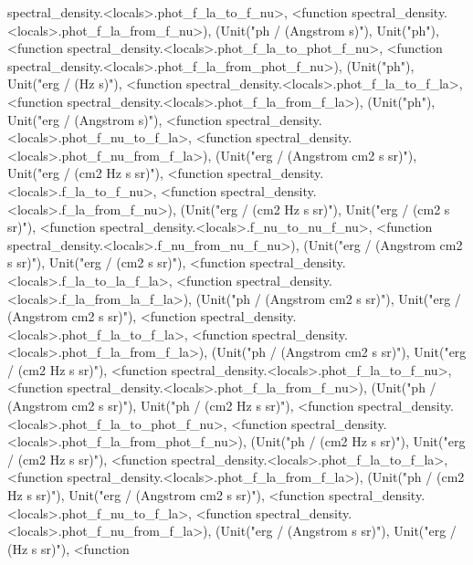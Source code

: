 \documentclass[letterpaper,10pt,english]{sphinxmanual}
\begin{document}
\begin{fulllineitems}
spectral\_density.\textless{}locals\textgreater{}.phot\_f\_la\_to\_f\_nu\textgreater{}, \textless{}function spectral\_density.\textless{}locals\textgreater{}.phot\_f\_la\_from\_f\_nu\textgreater{}), (Unit("ph / (Angstrom s)"), Unit("ph"), \textless{}function spectral\_density.\textless{}locals\textgreater{}.phot\_f\_la\_to\_phot\_f\_nu\textgreater{}, \textless{}function spectral\_density.\textless{}locals\textgreater{}.phot\_f\_la\_from\_phot\_f\_nu\textgreater{}), (Unit("ph"), Unit("erg / (Hz s)"), \textless{}function spectral\_density.\textless{}locals\textgreater{}.phot\_f\_la\_to\_f\_la\textgreater{}, \textless{}function spectral\_density.\textless{}locals\textgreater{}.phot\_f\_la\_from\_f\_la\textgreater{}), (Unit("ph"), Unit("erg / (Angstrom s)"), \textless{}function spectral\_density.\textless{}locals\textgreater{}.phot\_f\_nu\_to\_f\_la\textgreater{}, \textless{}function spectral\_density.\textless{}locals\textgreater{}.phot\_f\_nu\_from\_f\_la\textgreater{}), (Unit("erg / (Angstrom cm2 s sr)"), Unit("erg / (cm2 Hz s sr)"), \textless{}function spectral\_density.\textless{}locals\textgreater{}.f\_la\_to\_f\_nu\textgreater{}, \textless{}function spectral\_density.\textless{}locals\textgreater{}.f\_la\_from\_f\_nu\textgreater{}), (Unit("erg / (cm2 Hz s sr)"), Unit("erg / (cm2 s sr)"), \textless{}function spectral\_density.\textless{}locals\textgreater{}.f\_nu\_to\_nu\_f\_nu\textgreater{}, \textless{}function spectral\_density.\textless{}locals\textgreater{}.f\_nu\_from\_nu\_f\_nu\textgreater{}), (Unit("erg / (Angstrom cm2 s sr)"), Unit("erg / (cm2 s sr)"), \textless{}function spectral\_density.\textless{}locals\textgreater{}.f\_la\_to\_la\_f\_la\textgreater{}, \textless{}function spectral\_density.\textless{}locals\textgreater{}.f\_la\_from\_la\_f\_la\textgreater{}), (Unit("ph / (Angstrom cm2 s sr)"), Unit("erg / (Angstrom cm2 s sr)"), \textless{}function spectral\_density.\textless{}locals\textgreater{}.phot\_f\_la\_to\_f\_la\textgreater{}, \textless{}function spectral\_density.\textless{}locals\textgreater{}.phot\_f\_la\_from\_f\_la\textgreater{}), (Unit("ph / (Angstrom cm2 s sr)"), Unit("erg / (cm2 Hz s sr)"), \textless{}function spectral\_density.\textless{}locals\textgreater{}.phot\_f\_la\_to\_f\_nu\textgreater{}, \textless{}function spectral\_density.\textless{}locals\textgreater{}.phot\_f\_la\_from\_f\_nu\textgreater{}), (Unit("ph / (Angstrom cm2 s sr)"), Unit("ph / (cm2 Hz s sr)"), \textless{}function spectral\_density.\textless{}locals\textgreater{}.phot\_f\_la\_to\_phot\_f\_nu\textgreater{}, \textless{}function spectral\_density.\textless{}locals\textgreater{}.phot\_f\_la\_from\_phot\_f\_nu\textgreater{}), (Unit("ph / (cm2 Hz s sr)"), Unit("erg / (cm2 Hz s sr)"), \textless{}function spectral\_density.\textless{}locals\textgreater{}.phot\_f\_la\_to\_f\_la\textgreater{}, \textless{}function spectral\_density.\textless{}locals\textgreater{}.phot\_f\_la\_from\_f\_la\textgreater{}), (Unit("ph / (cm2 Hz s sr)"), Unit("erg / (Angstrom cm2 s sr)"), \textless{}function spectral\_density.\textless{}locals\textgreater{}.phot\_f\_nu\_to\_f\_la\textgreater{}, \textless{}function spectral\_density.\textless{}locals\textgreater{}.phot\_f\_nu\_from\_f\_la\textgreater{}), (Unit("erg / (Angstrom s sr)"), Unit("erg / (Hz s sr)"), \textless{}function 
\end{fulllineitems}
\end{document}
